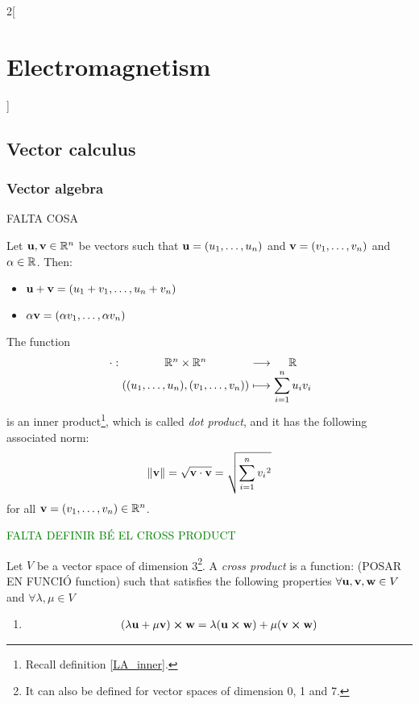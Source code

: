 \documentclass[../../../main.tex]{subfiles}
\begin{document}
\begin{multicols}{2}[\section{Electromagnetism}]
  \subsection{Vector calculus}
  \subsubsection{Vector algebra}
  FALTA COSA
  \begin{prop}
    Let $\boldsymbol{\mathrm{u}},\boldsymbol{\mathrm{v}}\in\mathbb{R}^n$ be vectors such that $\boldsymbol{\mathrm{u}}=(u_1,\ldots,u_n)$ and $\boldsymbol{\mathrm{v}}=(v_1,\ldots,v_n)$ and $\alpha\in\mathbb{R}$. Then:
    \begin{itemize}
      \item $\boldsymbol{\mathrm{u}}+\boldsymbol{\mathrm{v}}=(u_1+v_1,\ldots,u_n+v_n)$
      \item $\alpha\boldsymbol{\mathrm{v}}=(\alpha v_1,\ldots,\alpha v_n)$
    \end{itemize}
  \end{prop}
  \begin{prop}
    The function $$\function{\cdot}{\RR^n\times\RR^n}{\RR}{((u_1,\ldots,u_n),(v_1,\ldots,v_n))}{\displaystyle\sum_{i=1}^nu_iv_i}$$ is an inner product\footnote{Recall definition \ref{LA_inner}.}, which is called \textit{dot product}, and it has the following associated norm: $$\|\boldsymbol{\mathrm{v}}\|=\sqrt{\boldsymbol{\mathrm{v}}\cdot\boldsymbol{\mathrm{v}}}=\sqrt{\sum_{i=1}^n{v_i}^2}$$ for all $\boldsymbol{\mathrm{v}}=(v_1,\ldots,v_n)\in\mathbb{R}^n$.
  \end{prop}
  \textcolor{green}{FALTA DEFINIR BÉ EL CROSS PRODUCT}
  \begin{definition}
    Let $V$ be a vector space of dimension 3\footnote{It can also be defined for vector spaces of dimension 0, 1 and 7.}. A \textit{cross product} is a function: (POSAR EN FUNCIÓ function)
    such that satisfies the following properties $\forall \boldsymbol{\mathrm{u}},\boldsymbol{\mathrm{v}},\boldsymbol{\mathrm{w}}\in V$ and $\forall \lambda,\mu\in V$
    \begin{enumerate}
      \item \hfill
            \begin{gather*}
              (\lambda\vectorfunction{u}+\mu\vectorfunction{v})\crossprod \vectorfunction{w}=\lambda(\vectorfunction{u}\crossprod\vectorfunction{w})+\mu(\vectorfunction{v}\crossprod\vectorfunction{w})\\

\end{gather*}
\end{enumerate}
\end{definition}
\end{multicols}
\end{document}
